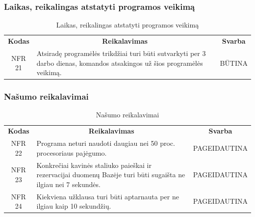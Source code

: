 \documentclass{VUMIFPSkursinis}
\begin{document}
\subsubsection{Laikas, reikalingas atstatyti programos veikimą}
\begin{center}
	\begin{table}[H]
	\caption{Laikas, reikalingas atstatyti programos veikimą}
	\begin{tabular}{|p{2cm}|p{}|p{}|}
	\hline
	    \rowcolor{lightgray}
		\multicolumn{3}{|c|}{Laikas, reikalingas atstatyti programos veikimą}\\
		
	\hline
		\multicolumn{1}{|c|}{{\bfseries Kodas}}&
		\multicolumn{1}{|c|}{{\bfseries Reikalavimas}}&
		\multicolumn{1}{|c|}{{\bfseries Svarba}}\\
	\hline 	
		\multicolumn{1}{|c|}{NFR 21}&
		{Atsiradę programėlės trikdžiai turi būti sutvarkyti per 3 darbo dienas, komandos atsakingos už šios programėlės veikimą.}&
		\multicolumn{1}{|c|}{BŪTINA}\\		
	\hline
	
	
	\end{tabular}
	
	\label{table:Laikasreikalingasatstatytiprogramosveikimą}
	\end{table}

\end{center}


\subsubsection{Našumo reikalavimai}
\begin{center}
	\begin{table}[H]
	\caption{Našumo reikalavimai}
	\begin{tabular}{|p{2cm}|p{}|p{}|}
	\hline
	    \rowcolor{lightgray}
		\multicolumn{3}{|c|}{Našumo reikalavimai}\\
		
	\hline
		\multicolumn{1}{|c|}{{\bfseries Kodas}}&
		\multicolumn{1}{|c|}{{\bfseries Reikalavimas}}&
		\multicolumn{1}{|c|}{{\bfseries Svarba}}\\
	\hline 	
		\multicolumn{1}{|c|}{NFR 22}&
		{Programa neturi naudoti daugiau nei 50 proc. procesoriaus pajėgumo.}&
		\multicolumn{1}{|p{1.5cm}|}{PAGEIDAUTINA}\\	
	\hline 	
		\multicolumn{1}{|c|}{NFR 23}&
		{Konkrečiai kavinės staliuko paieškai ir rezervacijai duomenų Bazėje turi būti sugaišta ne ilgiau nei 7 sekundės.}&
		\multicolumn{1}{|p{1.5cm}|}{PAGEIDAUTINA}\\	
	\hline 	
		\multicolumn{1}{|c|}{NFR 24}&
		{Kiekviena užklausa turi būti aptarnauta per ne ilgiau kaip 10 sekundžių.}&
		\multicolumn{1}{|p{1.5cm}|}{PAGEIDAUTINA}\\		
	\hline
	
	
	\end{tabular}
	
	\label{table:Našumoreikalavimai}
	\end{table}

\end{center}
\end{document}
